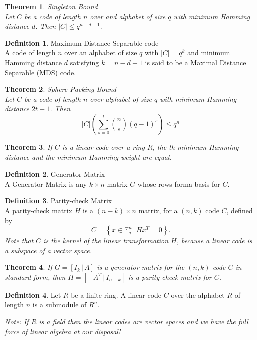 \documentclass{article}
\newcommand{\F}{\mathbb{F}}
\newtheorem{theorem}{Theorem}
\theoremstyle{definition}
\newtheorem{definition}{Definition}
\begin{document}
\begin{theorem}{Singleton Bound}\\
  Let $C$ be a code of length $n$ over and alphabet of size $q$ with minimum Hamming distance $d$. Then $|C| \leq q^{n-d+1}.$
\end{theorem}

\begin{definition}{Maximum Distance Separable code}\\
  A code of length $n$ over an alphabet of size $q$ with $|C| = q^k$ and minimum Hamming distance $d$ satisfying $k=n-d+1$ is said to be a Maximal Distance Separable (MDS) code.
\end{definition}

\begin{theorem}{Sphere Packing Bound}\\
  Let $C$ be a code of length $n$ over alphabet of size $q$ with minimum Hamming distance $2t+1$. Then
  \[|C|\left(\sum_{s=0}^t {n \choose s}(q-1)^s\right)\leq q^n\]
\end{theorem}

\begin{theorem}
  If $C$ is a linear code over a ring $R$, the th minimum Hamming distance and the minimum Hamming weight are equal.
\end{theorem}

\begin{definition}{Generator Matrix}\\
  A Generator Matrix is any $k\times n$ matrix $G$ whose rows forma  basis for $C$.
\end{definition}

\begin{definition}{Parity-check Matrix}\\
  A parity-check matrix $H$ is a $(n-k)\times n$ matrix, for a $(n,k)$ code $C$, defined by \[C = \left\{x\in\F^n_q \,|\, Hx^T = 0\right\}.\] \textit{Note that $C$ is the kernel of the linear transformation $H$, because a linear code is a subspace of a vector space.}
\end{definition}

\begin{theorem}
  If $G = [I_k \,|\, A]$ is a generator matrix for the $(n,k)$ code $C$ in standard form, then $H = [-A^T \,|\, I_{n-k}]$ is a parity check matrix for $C$.
\end{theorem}

\begin{definition}
  Let $R$ be a finite ring. A linear code $C$ over the alphabet $R$ of length $n$ is a submodule of $R^n$.
\end{definition}
\textit{Note: If $R$ is a field then the linear codes are vector spaces and we have the full force of linear algebra at our disposal!}
\end{document}
